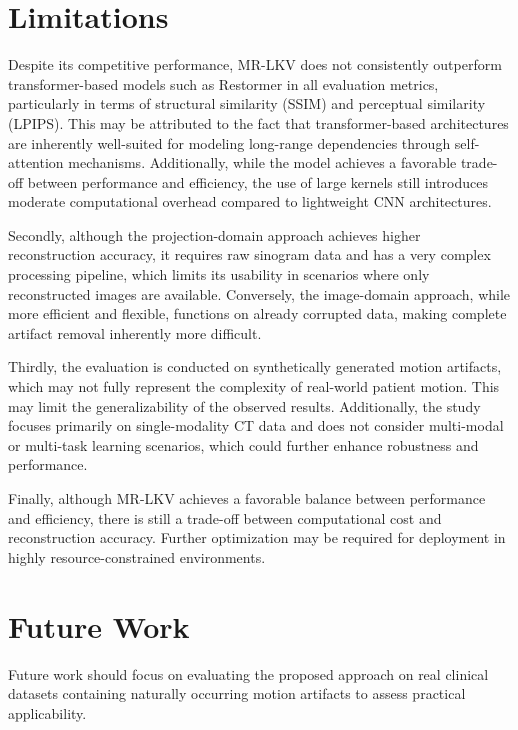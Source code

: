  

\section{Limitations}

Despite its competitive performance, MR-LKV does not consistently outperform transformer-based models such as Restormer in all evaluation metrics, particularly in terms of structural similarity (SSIM) and perceptual similarity (LPIPS). This may be attributed to the fact that transformer-based architectures are inherently well-suited for modeling long-range dependencies through self-attention mechanisms. Additionally, while the model achieves a favorable trade-off between performance and efficiency, the use of large kernels still introduces moderate computational overhead compared to lightweight CNN architectures.


Secondly, although the projection-domain approach achieves higher reconstruction accuracy, it requires raw sinogram data and has a very complex processing pipeline, which limits its usability in scenarios where only reconstructed images are available. Conversely, the image-domain approach, while more efficient and flexible, functions on already corrupted data, making complete artifact removal inherently more difficult. 


Thirdly, the evaluation is conducted on synthetically generated motion artifacts, which may not fully represent the complexity of real-world patient motion. This may limit the generalizability of the observed results. Additionally, the study focuses primarily on single-modality CT data and does not consider multi-modal or multi-task learning scenarios, which could further enhance robustness and performance. 

Finally, although MR-LKV achieves a favorable balance between performance and efficiency, there is still a trade-off between computational cost and reconstruction accuracy. Further optimization may be required for deployment in highly resource-constrained environments. 

 
 


\section{Future Work}

Future work should focus on evaluating the proposed approach on real clinical datasets containing naturally occurring motion artifacts to assess practical applicability.


